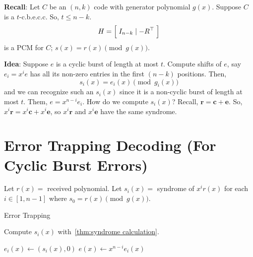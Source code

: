 \textbf{Recall}: Let $ C $ be an $ (n,k) $ code with generator polynomial
$ g(x) $. Suppose $ C $ is a $ t $-c.b.e.c.c. So, $ t\leqslant n-k $.
\[ H= \Bigl[\; I_{n-k}\mid -R^\top \;\Bigr] \]
is a PCM for $ C $; $ s(x)=r(x)\pmod{g(x)} $.

\textbf{Idea}: Suppose $ e $ is a cyclic burst of length at most $ t $.
Compute shifts of $ e $, say $ e_i=x^i e $ has all its non-zero entries in the first
$ (n-k) $ positions. Then,
\[ s_i(x)=e_i(x)\pmod{g_i(x)} \]
and we can recognize such an $ s_i(x) $ since it is a non-cyclic burst of length
at most $ t $. Them, $ e=x^{n-i}e_i $. How do we compute $ s_i(x) $? Recall,
$ \bm{r}=\bm{c}+\bm{e} $. So, $ x^i \bm{r}=x^i\bm{c}+x^i\bm{e} $, so
$ x^i \bm{r} $ and $ x^i\bm{e} $ have the same syndrome.

\section{Error Trapping Decoding (For Cyclic Burst Errors)}
Let $ r(x)= $ received polynomial. Let $ s_i(x)= $ syndrome of $ x^i r(x) $ for
each $ i\in[1,n-1] $ where $ s_0=r(x)\pmod{g(x)} $.

\begin{algbox}
    \begin{algorithm}[H]
        \DontPrintSemicolon{}
        \caption{Error Trapping}

         {
            Compute $ s_i(x) $ with~\ref{thm:syndrome calculation}.

             {
                $ e_i(x)\gets(s_i(x),0) $\;
                $ e(x)\gets x^{n-i}e_i(x) $\;
            }
        }
        \Return{}
    \end{algorithm}
\end{algbox}

